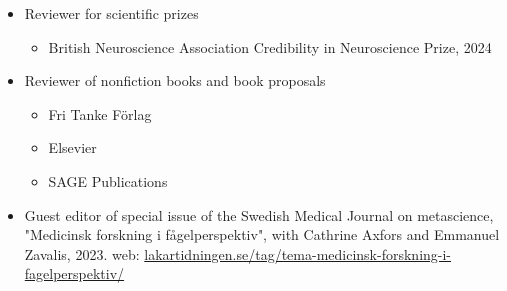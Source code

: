\documentclass[10pt]{article}
\begin{document}
\begin{itemize}[nolistsep]
\begin{itemize}[nolistsep]
	\item Horizon 2020 Marie Skłodowska Curie 2019
	\item Horizon 2020 Marie Skłodowska Curie 2020
	\item SPOKES Wellcome Trust Funded Translational Partnership Fellowships 2020, Berlin Institute of Health
	\item Horizon 2020 Future and Emerging Technologies (FET) Open 2020
	\item Horizon Europe Marie Skłodowska Curie 2021
	\item Norrsken Mind Foundation 2022
	\item ACX grants 2023
	\item ALF Region Skåne 2024
	\end{itemize}
\item Reviewer for scientific prizes
	\begin{itemize}[nolistsep]
	\item British Neuroscience Association Credibility in Neuroscience Prize, 2024
	\end{itemize}
\item Reviewer of nonfiction books and book proposals 
	\begin{itemize}[nolistsep]
	\item Fri Tanke Förlag
	\item Elsevier
	\item SAGE Publications
	\end{itemize}
\item Guest editor of special issue of the Swedish Medical Journal on metascience, "Medicinsk forskning i fågelperspektiv", with Cathrine Axfors and Emmanuel Zavalis, 2023. web: \href{https://lakartidningen.se/tag/tema-medicinsk-forskning-i-fagelperspektiv/}{lakartidningen.se/tag/tema-medicinsk-forskning-i-fagelperspektiv/}

\end{itemize}
\end{document}
